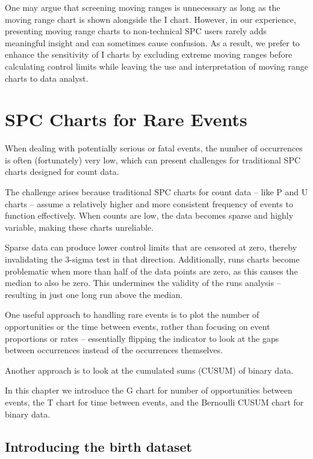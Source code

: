 \documentclass[
]{book}
\begin{document}
One may argue that screening moving ranges is unnecessary as long as the moving range chart is shown alongside the I chart. However, in our experience, presenting moving range charts to non-technical SPC users rarely adds meaningful insight and can sometimes cause confusion. As a result, we prefer to enhance the sensitivity of I charts by excluding extreme moving ranges before calculating control limits while leaving the use and interpretation of moving range charts to data analyst.

\chapter{SPC Charts for Rare Events}\label{spc-charts-for-rare-events}

When dealing with potentially serious or fatal events, the number of occurrences is often (fortunately) very low, which can present challenges for traditional SPC charts designed for count data.

The challenge arises because traditional SPC charts for count data -- like P and U charts -- assume a relatively higher and more consistent frequency of events to function effectively. When counts are low, the data becomes sparse and highly variable, making these charts unreliable.

Sparse data can produce lower control limits that are censored at zero, thereby invalidating the 3-sigma test in that direction. Additionally, runs charts become problematic when more than half of the data points are zero, as this causes the median to also be zero. This undermines the validity of the runs analysis -- resulting in just one long run above the median.

One useful approach to handling rare events is to plot the number of opportunities or the time between events, rather than focusing on event proportions or rates -- essentially flipping the indicator to look at the gaps between occurrences instead of the occurrences themselves.

Another approach is to look at the cumulated sums (CUSUM) of binary data.

In this chapter we introduce the G chart for number of opportunities between events, the T chart for time between events, and the Bernoulli CUSUM chart for binary data.

\section{Introducing the birth dataset}\label{introducing-the-birth-dataset}
\end{document}
